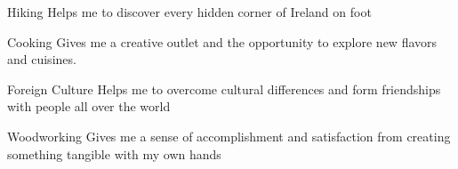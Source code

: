 
\begin{cvskills}

  \cvskill
    {Hiking} %
    {Helps me to discover every hidden corner of Ireland on foot} %

  \cvskill
    {Cooking} %
    {Gives me a creative outlet and the opportunity to explore new flavors and cuisines.} %

  \cvskill
    {Foreign Culture} %
    {Helps me to overcome cultural differences and form friendships with people all over the world} %

  \cvskill
    {Woodworking} %
    {Gives me a sense of accomplishment and satisfaction from creating something tangible with my own hands} %

\end{cvskills}

